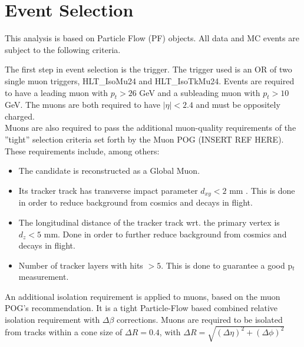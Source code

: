 \documentclass[
    10pt, %
    a4paper, %
    oneside, %
    headinclude,footinclude, %
    BCOR5mm, %
]{scrartcl}
\begin{document}
    \section{Event Selection}

    This analysis is based on Particle Flow (PF) objects. All data and MC events are subject to the following criteria.

    The first step in event selection is the trigger. The trigger used is an OR of two single muon triggers, HLT\_IsoMu24 and HLT\_IsoTkMu24. 
    Events are required to have a leading muon with $p_t > 26$ GeV and a subleading muon with $p_t > 10$ GeV. The muons are both required 
    to have $|\eta| < 2.4$ and must be oppositely charged. \\

    Muons are also required to pass the additional muon-quality requirements of the ''tight'' selection 
    criteria set forth by the Muon POG (INSERT REF HERE). These requirements include, among others: \\

    \begin{itemize}
        \item The candidate is reconstructed as a Global Muon. 
        \item Its tracker track has transverse impact parameter $d_{xy} < 2 $ mm . 
            This is done in order to reduce background from cosmics and decays in flight. 
        \item The longitudinal distance of the tracker track wrt. the primary vertex is $d_{z} < 5 $ mm.
            Done in order to further reduce background from cosmics and decays in flight.
        \item Number of tracker layers with hits $> 5$. This is done to guarantee a good p$_{t}$ measurement.
    \end{itemize}

    An additional isolation requirement is applied to muons, based on the muon POG's recommendation. 
    It is a tight Particle-Flow based combined relative isolation requirement with $\Delta \beta$ corrections.
    Muons are required to be isolated from tracks within a cone size of $\Delta R = 0.4$, with 
    $\Delta R = \sqrt{(\Delta \eta)^{2} + (\Delta \phi)^2}$\\
\end{document}
